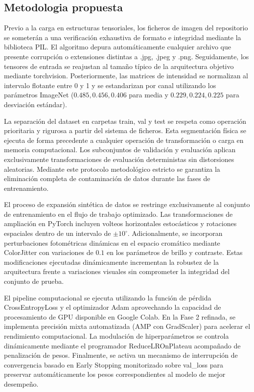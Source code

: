 \subsection{Metodologia propuesta}

Previo a la carga en estructuras tensoriales, los ficheros de imagen del repositorio se someterán a una verificación exhaustiva de formato e integridad mediante la biblioteca PIL. El algoritmo depura automáticamente cualquier archivo que presente corrupción o extensiones distintas a .jpg, .jpeg y .png. Seguidamente, los tensores de entrada se reajustan al tamaño típico de la arquitectura objetivo mediante torchvision. Posteriormente, las matrices de intensidad se normalizan al intervalo flotante entre 0 y 1 y se estandarizan por canal utilizando los parámetros ImageNet ($0.485, 0.456, 0.406$ para media y $0.229, 0.224, 0.225$ para desviación estándar).

La separación del dataset en carpetas train, val y test se respeta como operación prioritaria y rigurosa a partir del sistema de ficheros. Esta segmentación física se ejecuta de forma precedente a cualquier operación de transformación o carga en memoria computacional. Los subconjuntos de validación y evaluación aplican exclusivamente transformaciones de evaluación deterministas sin distorsiones aleatorias. Mediante este protocolo metodológico estricto se garantiza la eliminación completa de contaminación de datos durante las fases de entrenamiento.

El proceso de expansión sintética de datos se restringe exclusivamente al conjunto de entrenamiento en el flujo de trabajo optimizado. Las transformaciones de ampliación en PyTorch incluyen volteos horizontales estocásticos y rotaciones espaciales dentro de un intervalo de $\pm 10^{\circ}$. Adicionalmente, se incorporan perturbaciones fotométricas dinámicas en el espacio cromático mediante ColorJitter con variaciones de $0.1$ en los parámetros de brillo y contraste. Estas modificaciones ejecutadas dinámicamente incrementan la robustez de la arquitectura frente a variaciones visuales sin comprometer la integridad del conjunto de prueba.

El pipeline computacional se ejecuta utilizando la función de pérdida CrossEntropyLoss y el optimizador Adam aprovechando la capacidad de procesamiento de GPU disponible en Google Colab. En la Fase 2 refinada, se implementa precisión mixta automatizada (AMP con GradScaler) para acelerar el rendimiento computacional. La modulación de hiperparámetros se controla dinámicamente mediante el programador ReduceLROnPlateau acompañado de penalización de pesos. Finalmente, se activa un mecanismo de interrupción de convergencia basado en Early Stopping monitorizado sobre val\_loss para preservar automáticamente los pesos correspondientes al modelo de mejor desempeño.
